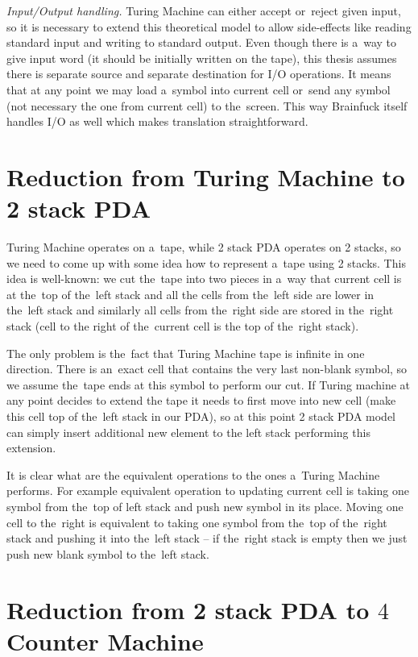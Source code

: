 \documentclass[english,shortabstract,mgr]{iithesis}
\begin{document}
\textit{Input/Output handling.}
Turing Machine can either accept or~reject given input, so it is necessary to
extend this theoretical model to allow side-effects like reading standard
input and writing to standard output. Even though there is a~way to give
input word (it should be initially written on the tape), this thesis assumes
there is separate source and separate destination for I/O operations.
It means that at any point we may load a~symbol into current cell or~send
any symbol (not necessary the one from current cell) to the~screen. This
way Brainfuck itself handles I/O as well which makes translation straightforward.

\section {Reduction from Turing Machine to 2 stack PDA}

Turing Machine operates on a~tape, while 2 stack PDA operates on 2 stacks, so we need
to come up with some idea how to represent a~tape using 2 stacks. This idea is well-known:
we cut the~tape into two pieces in a~way that current cell is at the~top of the~left stack and all
the cells from the~left side are lower in the~left stack and similarly all cells from the~right side
are stored in the~right stack (cell to the right of the~current cell is the top of the~right stack).

The only problem is the~fact that Turing Machine tape is infinite in one direction.
There is an~exact cell that contains the very last non-blank symbol, so we assume the~tape
ends at this symbol to perform our cut. If Turing machine at any point decides to extend
the tape it needs to first move into new cell (make this cell top of the~left stack in our PDA),
so at this point 2 stack PDA model can simply insert additional new element to the left
stack performing this extension.

It is clear what are the equivalent operations to the ones a~Turing Machine performs.
For example equivalent operation to updating current cell is taking one symbol from
the~top of left stack and push new symbol in its place. Moving one cell to the~right
is equivalent to taking one symbol from the~top of the~right stack and pushing it
into the~left stack -- if the~right stack is empty then we just push new blank symbol
to the~left stack.

\section {Reduction from 2 stack PDA to $4$ Counter Machine}
\end{document}
